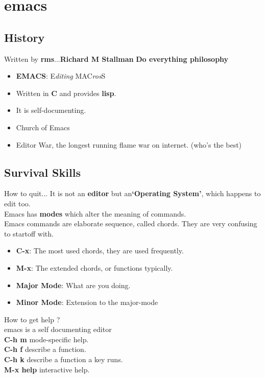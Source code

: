 \documentclass{beamer}
\begin{document}
\section{emacs}

\subsection{History}
\begin{frame}{Written by \textbf{rms}...}{\textbf{Richard M Stallman}}
	\textbf{Do everything philosophy} \\
	\pause
	\begin{itemize}
		\item {
				\textbf{EMACS}: \alert{E}\textit{diting} \alert{MAC}\textit{ros}\alert{S}
				\pause

			}
		\item {
				Written in \textbf{C} and provides \textbf{lisp}.
				\pause

			}
		\item {
				It is self-documenting.
				\pause
			}
		\item {
				Church of Emacs
				\pause
			}
		\item {
				Editor War, the longest running flame war on internet. (who's the best)

			}
	\end{itemize}
\end{frame}

\subsection{Survival Skills}
\begin{frame}{How to quit...}
	It is not an \textbf{editor} but an\textbf{`Operating System'}, which happens to edit too.\\
	Emacs has \textbf{modes} which alter the meaning of commands. \\
	Emacs commands are elaborate sequence, called \alert{chords}. They are very confusing to startoff with.
	\begin{itemize}
		\item {
			\textbf{C-x}: The most used chords, they are used frequently.
			\pause
			}

		\item {   
			\textbf{M-x}: The extended chords, or functions typically.
			\pause

			}
		\item {
			\textbf{Major Mode}: What are you doing.
			\pause
			}
		\item {
			\textbf{Minor Mode}: Extension to the major-mode
			\pause
			}
	\end{itemize}
	How to get \alert{help }?\\ 
	\pause
	emacs is a self documenting editor\\
	\textbf{C-h m} mode-specific help.\\
	\textbf{C-h f} describe a function.\\
	\textbf{C-h k} describe a function a key runs.\\
	\textbf{M-x help} interactive help.

\end{frame}
\end{document}
